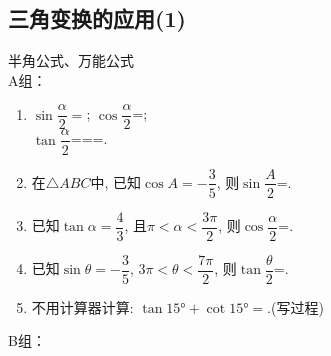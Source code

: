 \subsection{三角变换的应用(1)}
\zsd 半角公式、万能公式 \\
A组：
\begin{enumerate}
\item $\sin{\dfrac{\alpha}{2}}=$; $\cos{\dfrac{\alpha}{2}}$=;\\
$\tan{\dfrac{\alpha}{2}}$===.

\item 在$\triangle{ABC}$中, 已知$\cos{A}=-\dfrac{3}{5}$, 则$\sin\dfrac{A}{2}$=. 

\item 已知$\tan\alpha=\dfrac{4}{3}$, 且$\pi<\alpha<\dfrac{3\pi}{2}$, 则$\cos\dfrac{\alpha}{2}$=. 

\item 已知$\sin\theta=-\dfrac{3}{5}$, $3\pi<\theta<\dfrac{7\pi}{2}$, 则$\tan\dfrac{\theta}{2}$=. 

\item 不用计算器计算: $\tan\ang{15}+\cot\ang{15}=$.(写过程)
\end{enumerate}
B组：
